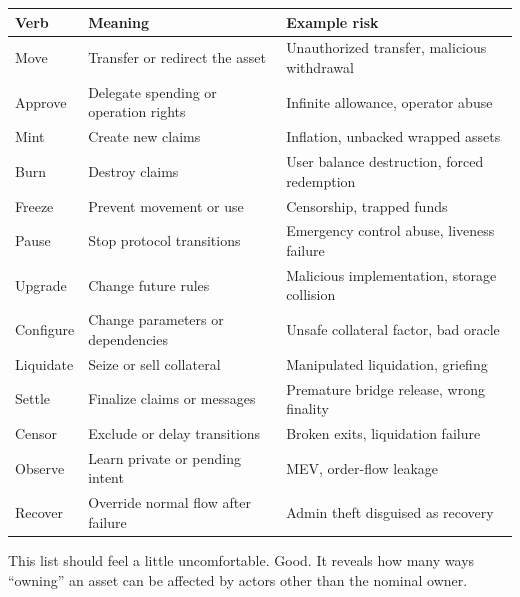 {\def\LTcaptype{none} %
\begin{longtable}[]{@{}
  >{\raggedright\arraybackslash}p{}
  >{\raggedright\arraybackslash}p{}
  >{\raggedright\arraybackslash}p{}@{}}
\toprule\noalign{}
\begin{minipage}[b]{\linewidth}\raggedright
Verb
\end{minipage} & \begin{minipage}[b]{\linewidth}\raggedright
Meaning
\end{minipage} & \begin{minipage}[b]{\linewidth}\raggedright
Example risk
\end{minipage} \\
\midrule\noalign{}
\endhead
\bottomrule\noalign{}
\endlastfoot
Move & Transfer or redirect the asset & Unauthorized transfer, malicious
withdrawal \\
Approve & Delegate spending or operation rights & Infinite allowance,
operator abuse \\
Mint & Create new claims & Inflation, unbacked wrapped assets \\
Burn & Destroy claims & User balance destruction, forced redemption \\
Freeze & Prevent movement or use & Censorship, trapped funds \\
Pause & Stop protocol transitions & Emergency control abuse, liveness
failure \\
Upgrade & Change future rules & Malicious implementation, storage
collision \\
Configure & Change parameters or dependencies & Unsafe collateral
factor, bad oracle \\
Liquidate & Seize or sell collateral & Manipulated liquidation,
griefing \\
Settle & Finalize claims or messages & Premature bridge release, wrong
finality \\
Censor & Exclude or delay transitions & Broken exits, liquidation
failure \\
Observe & Learn private or pending intent & MEV, order-flow leakage \\
Recover & Override normal flow after failure & Admin theft disguised as
recovery \\
\end{longtable}
}

This list should feel a little uncomfortable. Good. It reveals how many
ways ``owning'' an asset can be affected by actors other than the
nominal owner.

